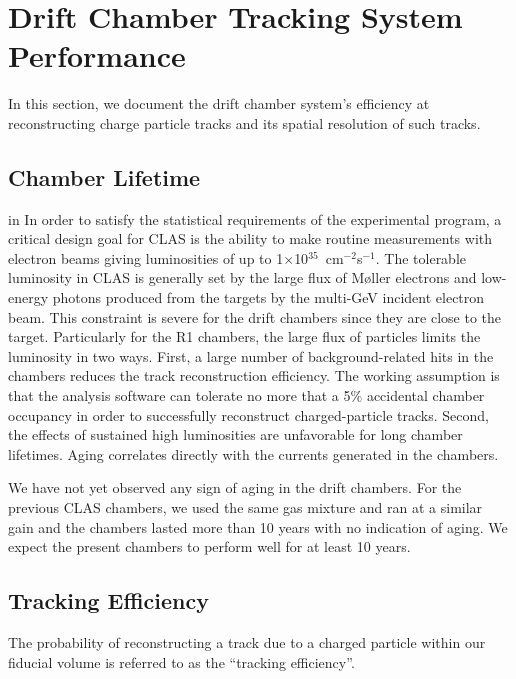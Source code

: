 \section{Drift Chamber Tracking System Performance}
In this section, we document the drift chamber system's
efficiency at reconstructing charge particle tracks and
its spatial resolution of such tracks.




\subsection{Chamber Lifetime}
\label{choper}

 in 
In order to satisfy the statistical requirements of the experimental program, 
a critical design goal for CLAS is the ability to make routine measurements 
with electron beams giving luminosities of up to 
1$\times$10$^{35}$~cm$^{-2}$s$^{-1}$.  The tolerable luminosity in CLAS is 
generally set by the large flux of M{\o}ller electrons and low-energy photons 
produced from the targets by the multi-GeV incident electron beam.  This 
constraint is severe for the drift chambers since they are close to the 
target. Particularly for the R1 chambers, the large flux of 
particles limits the luminosity in two ways.  First, a large number of 
background-related hits in the chambers reduces the track reconstruction 
efficiency.  The working assumption is that the analysis software can tolerate 
no more that a 5$\%$ accidental chamber occupancy in order to successfully 
reconstruct charged-particle tracks.  Second, the effects of sustained high 
luminosities are unfavorable for long chamber lifetimes.  Aging correlates 
directly with the currents generated in the chambers.

We have not yet observed any sign of aging in the drift chambers.
For the previous CLAS chambers, we used the same gas mixture and ran at a
similar gain and the chambers lasted more than 10 years with no indication
of aging.  We expect the present
chambers to perform well for at least 10 years.


\subsection{Tracking Efficiency}

\hskip 0.15in
The probability of reconstructing a track due to a charged particle within
our fiducial volume is referred to as the ``tracking efficiency''.

